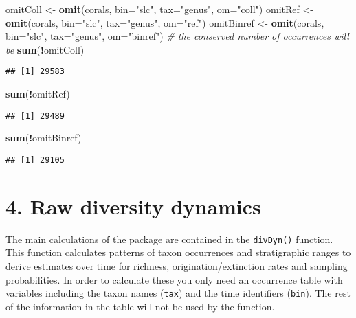 \documentclass[]{article}
\newenvironment{Shaded}{\begin{snugshade}}{\end{snugshade}}
\newcommand{\CommentTok}[1]{\textcolor[rgb]{0.56,0.35,0.01}{\textit{#1}}}
\newcommand{\DataTypeTok}[1]{\textcolor[rgb]{0.13,0.29,0.53}{#1}}
\newcommand{\KeywordTok}[1]{\textcolor[rgb]{0.13,0.29,0.53}{\textbf{#1}}}
\newcommand{\NormalTok}[1]{#1}
\newcommand{\OperatorTok}[1]{\textcolor[rgb]{0.81,0.36,0.00}{\textbf{#1}}}
\newcommand{\StringTok}[1]{\textcolor[rgb]{0.31,0.60,0.02}{#1}}
\begin{document}
\begin{Shaded}
\begin{Highlighting}[]
\NormalTok{omitColl <-}\StringTok{ }\KeywordTok{omit}\NormalTok{(corals, }\DataTypeTok{bin=}\StringTok{"slc"}\NormalTok{, }\DataTypeTok{tax=}\StringTok{"genus"}\NormalTok{, }\DataTypeTok{om=}\StringTok{"coll"}\NormalTok{)}
\NormalTok{omitRef <-}\StringTok{ }\KeywordTok{omit}\NormalTok{(corals, }\DataTypeTok{bin=}\StringTok{"slc"}\NormalTok{, }\DataTypeTok{tax=}\StringTok{"genus"}\NormalTok{, }\DataTypeTok{om=}\StringTok{"ref"}\NormalTok{)}
\NormalTok{omitBinref <-}\StringTok{ }\KeywordTok{omit}\NormalTok{(corals, }\DataTypeTok{bin=}\StringTok{"slc"}\NormalTok{, }\DataTypeTok{tax=}\StringTok{"genus"}\NormalTok{, }\DataTypeTok{om=}\StringTok{"binref"}\NormalTok{)}
\CommentTok{# the conserved number of occurrences will be}
\KeywordTok{sum}\NormalTok{(}\OperatorTok{!}\NormalTok{omitColl)}
\end{Highlighting}
\end{Shaded}

\begin{verbatim}
## [1] 29583
\end{verbatim}

\begin{Shaded}
\begin{Highlighting}[]
\KeywordTok{sum}\NormalTok{(}\OperatorTok{!}\NormalTok{omitRef)}
\end{Highlighting}
\end{Shaded}

\begin{verbatim}
## [1] 29489
\end{verbatim}

\begin{Shaded}
\begin{Highlighting}[]
\KeywordTok{sum}\NormalTok{(}\OperatorTok{!}\NormalTok{omitBinref)}
\end{Highlighting}
\end{Shaded}

\begin{verbatim}
## [1] 29105
\end{verbatim}

\hypertarget{raw-diversity-dynamics}{%
\section{4. Raw diversity dynamics}\label{raw-diversity-dynamics}}

The main calculations of the package are contained in the
\texttt{divDyn()} function. This function calculates patterns of taxon
occurrences and stratigraphic ranges to derive estimates over time for
richness, origination/extinction rates and sampling probabilities. In
order to calculate these you only need an occurrence table with
variables including the taxon names (\texttt{tax}) and the time
identifiers (\texttt{bin}). The rest of the information in the table
will not be used by the function.
\end{document}
